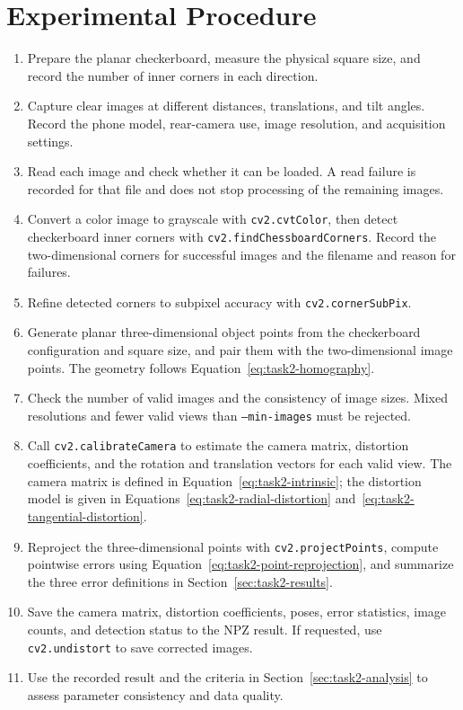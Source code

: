 \section{Experimental Procedure}\label{sec:task2-procedure}

\begin{enumerate}
    \item Prepare the planar checkerboard, measure the physical square size, and record the number of inner corners in each direction.
    \item Capture clear images at different distances, translations, and tilt angles. Record the phone model, rear-camera use, image resolution, and acquisition settings.
    \item Read each image and check whether it can be loaded. A read failure is recorded for that file and does not stop processing of the remaining images.
    \item Convert a color image to grayscale with \texttt{cv2.cvtColor}, then detect checkerboard inner corners with \texttt{cv2.findChessboardCorners}. Record the two-dimensional corners for successful images and the filename and reason for failures.
    \item Refine detected corners to subpixel accuracy with \texttt{cv2.cornerSubPix}.
    \item Generate planar three-dimensional object points from the checkerboard configuration and square size, and pair them with the two-dimensional image points. The geometry follows Equation~\ref{eq:task2-homography}.
    \item Check the number of valid images and the consistency of image sizes. Mixed resolutions and fewer valid views than \texttt{--min-images} must be rejected.
    \item Call \texttt{cv2.calibrateCamera} to estimate the camera matrix, distortion coefficients, and the rotation and translation vectors for each valid view. The camera matrix is defined in Equation~\ref{eq:task2-intrinsic}; the distortion model is given in Equations~\ref{eq:task2-radial-distortion} and~\ref{eq:task2-tangential-distortion}.
    \item Reproject the three-dimensional points with \texttt{cv2.projectPoints}, compute pointwise errors using Equation~\ref{eq:task2-point-reprojection}, and summarize the three error definitions in Section~\ref{sec:task2-results}.
    \item Save the camera matrix, distortion coefficients, poses, error statistics, image counts, and detection status to the NPZ result. If requested, use \texttt{cv2.undistort} to save corrected images.
    \item Use the recorded result and the criteria in Section~\ref{sec:task2-analysis} to assess parameter consistency and data quality.
\end{enumerate}

